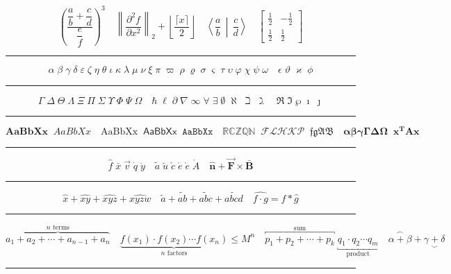 \documentclass[10pt,a4paper,fleqn]{article}
\newcommand{\overparen}[1]{\overset{\frown}{#1}}
\newcommand{\underparen}[1]{\underset{\smile}{#1}}
\newcommand{\secdiv}{%
  \par\nobreak\vspace{1pt}%
  \noindent\rule{\linewidth}{0.5pt}%
  \par\nobreak\vspace{1pt}%
}
\begin{document}
\[
  \left(\frac{\dfrac{a}{b}+\dfrac{c}{d}}{\dfrac{e}{f}}\right)^{\!3}
  \quad
  \left\|\frac{\partial^2 f}{\partial x^2}\right\|_2
    +\left\lfloor\frac{\lceil x\rceil}{2}\right\rfloor
  \quad
  \left\langle\frac{a}{b}\,\middle|\,\frac{c}{d}\right\rangle
  \quad
  \left[\begin{matrix}\frac{1}{2}&-\frac{1}{2}\\[2pt]\frac{1}{2}&\frac{1}{2}\end{matrix}\right]
\]
\secdiv

\[
  \alpha\;\beta\;\gamma\;\delta\;\varepsilon\;\zeta\;\eta\;\theta\;
  \iota\;\kappa\;\lambda\;\mu\;\nu\;\xi\;\pi\;\varpi\;\rho\;\varrho\;
  \sigma\;\varsigma\;\tau\;\upsilon\;\varphi\;\chi\;\psi\;\omega
  \quad
  \epsilon\;\vartheta\;\varkappa\;\phi
\]
\secdiv

\[
  \Gamma\;\Delta\;\Theta\;\Lambda\;\Xi\;\Pi\;\Sigma\;\Upsilon\;\Phi\;\Psi\;\Omega
  \quad
  \hbar\;\ell\;\partial\;\nabla\;\infty\;\forall\;\exists\;\emptyset\;
  \aleph\;\beth\;\gimel
  \quad
  \Re\;\Im\;\wp\;\imath\;\jmath
\]
\secdiv

\[
  \mathbf{AaBbXx}\;\;\mathit{AaBbXx}
  \quad
  \mathrm{AaBbXx}\;\;\mathsf{AaBbXx}\;\;\mathtt{AaBbXx}
  \quad
  \mathbb{RCZQN}\;\;\mathcal{FLHKP}\;\;\mathfrak{fgAB}
  \quad
  \boldsymbol{\alpha\beta\gamma\Gamma\Delta\Omega}\;\;
  \mathbf{x}^{\mathbf{T}}\mathbf{A}\mathbf{x}
\]
\secdiv

\[
  \hat{f}\;\bar{x}\;\vec{v}\;\dot{q}\;\ddot{y}
  \quad
  \tilde{a}\;\breve{u}\;\check{c}\;\acute{e}\;\grave{e}\;\mathring{A}
  \quad
  \hat{\mathbf{n}}+\vec{\mathbf{F}}\times\bar{\mathbf{B}}
\]
\secdiv

\[
  \widehat{x}+\widehat{xy}+\widehat{xyz}+\widehat{xyzw}
  \quad
  \widetilde{a}+\widetilde{ab}+\widetilde{abc}+\widetilde{abcd}
  \quad
  \widehat{f\cdot g}=\hat{f}*\hat{g}
\]
\secdiv

\[
  \overbrace{a_1+a_2+\cdots+a_{n-1}+a_n}^{n\text{ terms}}
  \quad
  \underbrace{f(x_1)\cdot f(x_2)\cdots f(x_n)}_{n\text{ factors}}\leq M^n
  \quad
  \overbracket{p_1+p_2+\cdots+p_k}^{\text{sum}}\;
  \underbracket{q_1\cdot q_2\cdots q_m}_{\text{product}}
  \quad
  \overparen{\alpha+\beta}+\underparen{\gamma+\delta}
\]
\secdiv
\end{document}
